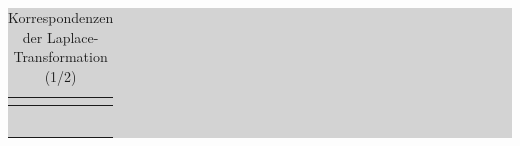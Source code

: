 \begin{table}[H]
\setlength{\arrayrulewidth}{.1em}
\caption{Korrespondenzen der Laplace-Transformation (1/2)}
\setlength{\fboxsep}{0pt}%
\colorbox{lightgray}{%
%
\begin{tabular}{| c | c | c | c |}
\hline
\parbox[c][0.3in][c]{0.3in}{\smallskip\centering\textbf{\selectfont{Nr}}} &
\parbox[c][0.5in][c]{2.4in}{\smallskip\centering\textbf{\selectfont{Zeitfunktion x(t)}}} & \parbox[c][0.5in][c]{1.2in}{\smallskip\centering\textbf{\selectfont{Konvergenz-\\bereich}}} &
\parbox[c][0.5in][c]{2.4in}{\smallskip\centering\textbf{\selectfont{Laplace-Transformierte X(s)}}}\\ \hline

\parbox[c][0.5in][c]{0.3in}{} &
\parbox[c][0.5in][c]{2.4in}{} & 
\parbox[c][0.5in][c]{1.2in}{} & 
\parbox[c][0.5in][c]{2.4in}{}\\
\hline

\parbox[c][0.5in][c]{0.3in}{} &
\parbox[c][0.5in][c]{2.4in}{} & 
\parbox[c][0.5in][c]{1.2in}{} & 
\parbox[c][0.5in][c]{2.4in}{}\\
\hline

\parbox[c][0.5in][c]{0.3in}{} &
\parbox[c][0.5in][c]{2.4in}{} & 
\parbox[c][0.5in][c]{1.2in}{} & 
\parbox[c][0.5in][c]{2.4in}{}\\
\hline

\parbox[c][0.5in][c]{0.3in}{} &
\parbox[c][0.5in][c]{2.4in}{} & 
\parbox[c][0.5in][c]{1.2in}{} & 
\parbox[c][0.5in][c]{2.4in}{}\\
\hline

\parbox[c][0.5in][c]{0.3in}{} &
\parbox[c][0.5in][c]{2.4in}{} & 
\parbox[c][0.5in][c]{1.2in}{} & 
\parbox[c][0.5in][c]{2.4in}{}\\
\hline

\parbox[c][0.5in][c]{0.3in}{} &
\parbox[c][0.5in][c]{2.4in}{} & 
\parbox[c][0.5in][c]{1.2in}{} & 
\parbox[c][0.5in][c]{2.4in}{}\\
\hline


\end{tabular}}
\end{table}
